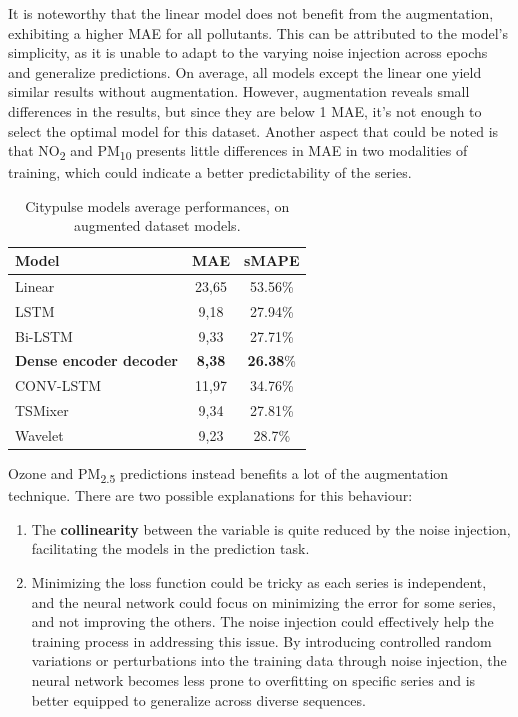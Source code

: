 It is noteworthy that the linear model does not benefit from the augmentation, exhibiting a higher MAE for all pollutants. This can be attributed to the model's simplicity, as it is unable to adapt to the varying noise injection across epochs and generalize predictions. On average, all models except the linear one yield similar results without augmentation. However, augmentation reveals small differences in the results, but since they are below 1 MAE, it's not enough to select the optimal model for this dataset.
Another aspect that could be noted is that NO\textsubscript{2} and PM\textsubscript{10} presents little differences in MAE in two modalities of training, which could indicate a better predictability of the series.

\begin{table}[h]
    \centering
    \begin{tabular}{lcc}
        \toprule
        \textbf{Model} & \textbf{MAE} & \textbf{sMAPE} \\ 
        \midrule
        Linear & 23,65 & 53.56\% \\
        LSTM & 9,18 & 27.94\% \\
        Bi-LSTM & 9,33 & 27.71\% \\
        \textbf{Dense encoder decoder} & \textbf{8,38} & \textbf{26.38}\% \\
        CONV-LSTM & 11,97 & 34.76\% \\
        TSMixer & 9,34 & 27.81\% \\
        Wavelet & 9,23 & 28.7\% \\ 
        \bottomrule
        \end{tabular}
        \caption{Citypulse models average performances, on augmented dataset models.}
        \label{tab:Citypulse performances}
\end{table}


Ozone and PM\textsubscript{2.5} predictions instead benefits a lot of the augmentation technique. There are two possible explanations for this behaviour:
\begin{enumerate}
    \item The \textbf{collinearity} between the variable is quite reduced by the noise injection, facilitating the models in the prediction task.
    \item Minimizing the loss function could be tricky as each series is independent, and the neural network could focus on minimizing the error for some series, and not improving the others. The noise injection could effectively help the training process in addressing this issue. By introducing controlled random variations or perturbations into the training data through noise injection, the neural network becomes less prone to overfitting on specific series and is better equipped to generalize across diverse sequences.
\end{enumerate}

